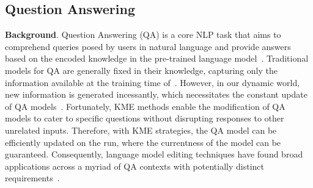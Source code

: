 \documentclass[acmsmall, screen]{acmart}
\begin{document}
\subsection{Question Answering}
{\textbf{Background}.} Question Answering (QA) is a core NLP task that aims to comprehend queries posed by users in natural language and provide answers based on the encoded knowledge in the pre-trained language model~\cite{shin2020autoprompt}. Traditional models for QA are generally fixed in their knowledge, capturing only the information available at the training time of~\cite{petroni2019language, jiang2020can}. However, in our dynamic world, new information is generated incessantly, which necessitates the constant update of QA models~\cite{talmor2018commonsenseqa}. Fortunately, KME methods enable the modification of QA models to cater to specific questions without disrupting responses to other unrelated inputs. Therefore, with KME strategies, the QA model can be efficiently updated on the run, where the currentness of the model can be guaranteed. Consequently, language model editing techniques have found broad applications across a myriad of QA contexts with potentially distinct requirements~\cite{lee2022plugandplay}.



\end{document}
